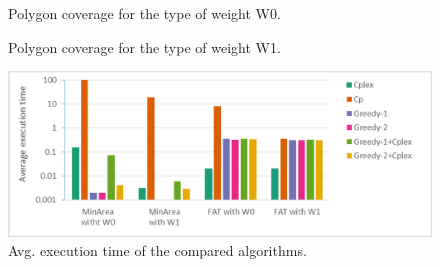 \documentclass[runningheads,a4paper]{elsarticle}
\begin{document}
    \begin{figure}
    	\centering{}
    	\caption{Polygon coverage for the type of weight W0.}
    	\label{fig:covw0}
    \end{figure}
    
    \begin{figure}
    	\centering
    	\centering{}
    	\caption{Polygon coverage for the type of weight W1.}
    	\label{fig:covw1}
    \end{figure}
   
    \begin{figure}
    	\centering
    	\includegraphics[width=\textwidth]{grafikon3.eps}
    	\caption{Avg. execution time of the compared algorithms.}
    	\label{fig:timealg}
    \end{figure}
    
    
\end{document}
